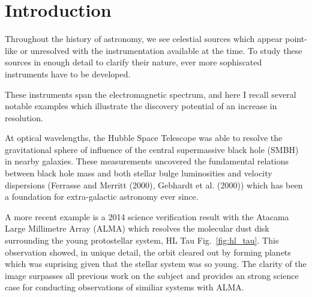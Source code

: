 \chapter{Introduction}






Throughout the history of astronomy, we see celestial sources which appear point-like or unresolved with the instrumentation available at the time. To study these sources in enough detail to clarify their nature, ever more sophiscated instruments have to be developed. 

These instruments span the electromagnetic spectrum, and here I recall several notable examples which illustrate the discovery potential of an increase in resolution.

At optical wavelengths, the Hubble Space Telescope was able to resolve the gravitational sphere of influence of the central supermassive black hole (SMBH) in nearby galaxies. These measurements uncovered the fundamental relations between black hole mass and both stellar bulge luminosities and velocity dispersions (Ferrasse and Merritt (2000), Gebhardt et al. (2000)) which has been a foundation for extra-galactic astronomy ever since. 

A more recent example is a 2014 science verification result with the Atacama Large Millimetre Array (ALMA) \cite{brogan_2015} which resolves the molecular dust disk surrounding the young protostellar system, HL Tau Fig.~\ref{fig:hl_tau}. This observation showed, in unique detail, the orbit cleared out by forming planets which was suprising given that the stellar system was so young. The clarity of the image surpasses all previous work on the subject and provides an strong science case for conducting observations of similiar systems with ALMA. 

